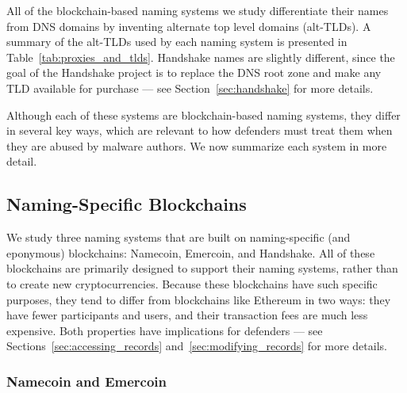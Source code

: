 All of the blockchain-based naming systems we study differentiate their names 
from DNS domains by inventing alternate top level domains (alt-TLDs). A 
summary of the alt-TLDs used by each naming system is presented in 
Table~\ref{tab:proxies_and_tlds}. Handshake names are slightly different, since 
the goal of the Handshake project is to replace the DNS root zone and make any 
TLD available for purchase --- see Section~\ref{sec:handshake} for more details.

Although each of these systems are blockchain-based naming 
systems, they differ in several key ways, which are relevant to how defenders 
must treat them when they are abused by malware authors. We now summarize each 
system in more detail.

\subsection{Naming-Specific Blockchains}

We study three naming systems that are built on 
naming-specific (and eponymous) blockchains: 
Namecoin, Emercoin, and Handshake. All of these blockchains 
are primarily designed to support their naming systems,  
rather than to create new cryptocurrencies. Because these 
blockchains have such specific purposes, they tend to differ 
from blockchains like Ethereum in two ways: they have fewer 
participants and users, and their transaction fees are much 
less expensive. Both properties have implications for 
defenders --- see Sections~\ref{sec:accessing_records} 
and~\ref{sec:modifying_records} for more details. 

\subsubsection{Namecoin and Emercoin}

